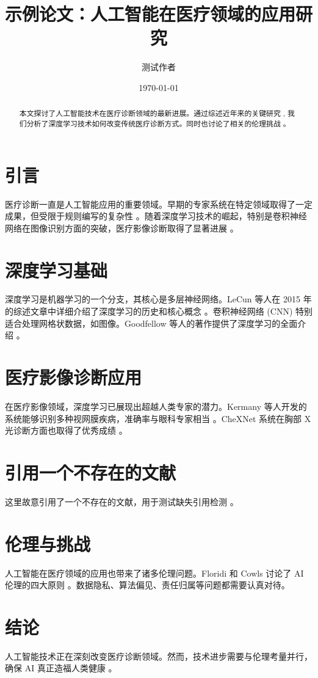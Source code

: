 \documentclass{article}
\title{示例论文：人工智能在医疗领域的应用研究}
\author{测试作者}
\date{\today}
\begin{document}
\maketitle

\begin{abstract}
本文探讨了人工智能技术在医疗诊断领域的最新进展。通过综述近年来的关键研究 \citet{lecun2015deep, goodfellow2016deep}, 我们分析了深度学习技术如何改变传统医疗诊断方式。同时也讨论了相关的伦理挑战 \citep{floridi2018aiethics}。
\end{abstract}

\section{引言}

医疗诊断一直是人工智能应用的重要领域。早期的专家系统在特定领域取得了一定成果，但受限于规则编写的复杂性 \cite{shortliffe1976mycin}。随着深度学习技术的崛起，特别是卷积神经网络在图像识别方面的突破，医疗影像诊断取得了显著进展 \citet{kermany2018identifying, rajpurkar2017chexnet}。

\section{深度学习基础}

深度学习是机器学习的一个分支，其核心是多层神经网络。LeCun 等人在 2015 年的综述文章中详细介绍了深度学习的历史和核心概念 \cite{lecun2015deep}。卷积神经网络 (CNN) 特别适合处理网格状数据，如图像。Goodfellow 等人的著作提供了深度学习的全面介绍 \cite{goodfellow2016deep}。

\section{医疗影像诊断应用}

在医疗影像领域，深度学习已展现出超越人类专家的潜力。Kermany 等人开发的系统能够识别多种视网膜疾病，准确率与眼科专家相当 \citep{kermany2018identifying}。CheXNet 系统在胸部 X 光诊断方面也取得了优秀成绩 \cite{rajpurkar2017chexnet}。

\section{引用一个不存在的文献}

这里故意引用了一个不存在的文献，用于测试缺失引用检测 \cite{nonexistent2024paper}。

\section{伦理与挑战}

人工智能在医疗领域的应用也带来了诸多伦理问题。Floridi 和 Cowls 讨论了 AI 伦理的四大原则 \cite{floridi2018aiethics}。数据隐私、算法偏见、责任归属等问题都需要认真对待。

\section{结论}

人工智能技术正在深刻改变医疗诊断领域。然而，技术进步需要与伦理考量并行，确保 AI 真正造福人类健康 \citep{lecun2015deep, floridi2018aiethics}。



\end{document}
